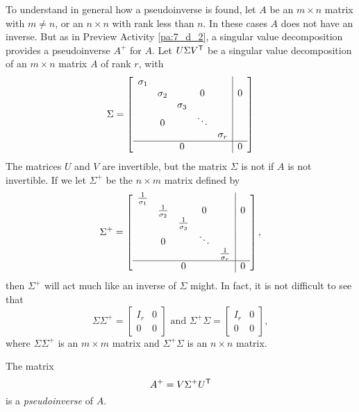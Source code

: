 To understand in general how a pseudoinverse is found, let $A$ be an $m \times n$ matrix with $m \neq n$, or an $n \times n$ with rank less than $n$. In these cases $A$ does not have an inverse. But as in Preview Activity \ref{pa:7_d_2}, a singular value decomposition provides a pseudoinverse $A^+$ for $A$. Let $U \Sigma V^{\mathsf{T}}$ be a singular value decomposition of an $m \times n$ matrix $A$ of rank $r$, with
\[\Sigma = \left[ \begin{array}{ccccc|c} \sigma_1&&&&& \\ & \sigma_2&&0&&0 \\ && \sigma_3&&& \\ & 0 & & \ddots & & \\ &&&& \sigma_r \\ \hline &&0&&&0 \end{array} \right] \]
The matrices $U$ and $V$ are invertible, but the matrix $\Sigma$ is not if $A$ is not invertible. If we let $\Sigma^+$ be the $n \times m$ matrix defined by
\[\Sigma^{+} = \left[ \begin{array}{ccccc|c} \frac{1}{\sigma_1}&&&&& \\ & \frac{1}{\sigma_2}&&0&&0 \\ && \frac{1}{\sigma_3}&&& \\ & 0 & & \ddots & & \\ &&&& \frac{1}{\sigma_r} \\ \hline &&0&&&0 \end{array} \right],\]
then $\Sigma^{+}$ will act much like an inverse of $\Sigma$ might. In fact, it is not difficult to see that
\[\Sigma\Sigma^{+} = \left[ \begin{array}{c|c} I_r&0 \\ \hline 0&0 \end{array} \right] \text{ and } \Sigma^{+}\Sigma = \left[ \begin{array}{c|c} I_r&0 \\ \hline 0&0 \end{array} \right],\]
where $\Sigma\Sigma^{+}$ is an $m \times m$ matrix and $\Sigma^{+}\Sigma$ is an $n \times n$ matrix.

The matrix
\begin{equation}
A^{+} = V\Sigma^{+}U^{\mathsf{T}} \label{eq:pseudoinverse}
\end{equation}
is a \emph{pseudoinverse} of $A$. 


